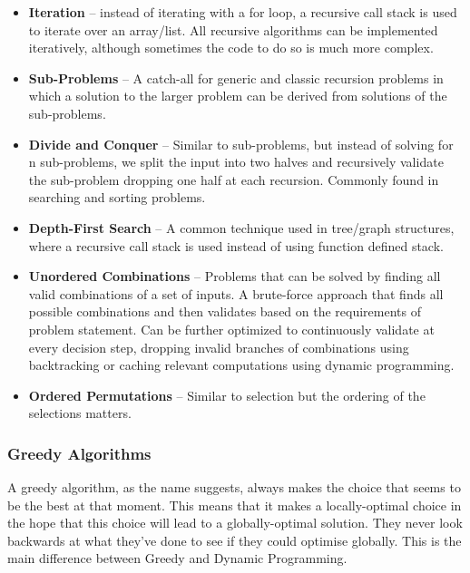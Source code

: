 \documentclass{article}
\begin{document}
    \begin{itemize}
        \item \textbf{Iteration} -- instead of iterating with a for loop, a recursive call stack is used to iterate over an array/list. All recursive algorithms can be implemented iteratively, although sometimes the code to do so is much more complex. 
        
        \item \textbf{Sub-Problems} -- A catch-all for generic and classic recursion problems in which a solution to the larger problem can be derived from solutions of the sub-problems.
        
        \item \textbf{Divide and Conquer} -- Similar to sub-problems, but instead of solving for n sub-problems, we split the input into two halves and recursively validate the sub-problem dropping one half at each recursion. Commonly found in searching and sorting problems.
        
        \item \textbf{Depth-First Search} --  A common technique used in tree/graph structures, where a recursive call stack is used instead of using function defined stack.
        
        \item \textbf{Unordered Combinations} -- Problems that can be solved by finding all valid combinations of a set of inputs. A brute-force approach that finds all possible combinations and then validates based on the requirements of problem statement. Can be further optimized to continuously validate at every decision step, dropping invalid branches of combinations using backtracking or caching relevant computations using dynamic programming.
        
        \item \textbf{Ordered Permutations} -- Similar to selection but the ordering of the selections matters.  
        
        
    \end{itemize}
    
    \subsubsection{Greedy Algorithms}
    A greedy algorithm, as the name suggests, always makes the choice that seems to be the best at that moment. This means that it makes a locally-optimal choice in the hope that this choice will lead to a globally-optimal solution. They never look backwards at what they’ve done to see if they could optimise globally. This is the main difference between Greedy and Dynamic Programming.
\end{document}
